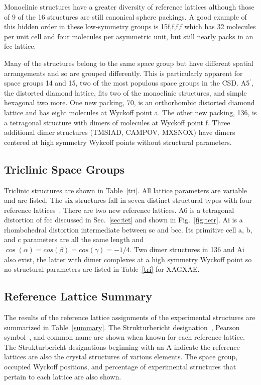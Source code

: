 \documentclass[preprint]{revtex4}              %
\begin{document}
Monoclinic structures have a greater diversity of reference lattices
although those of 9 of the 16 structures are still canonical sphere
packings. A good example of this hidden order in these low-symmetry
groups is 15f,f,f,f which has 32 molecules per unit cell and four
molecules per asymmetric unit, but still nearly packs in an fcc
lattice.

Many of the structures belong to the same space group but have
different spatial arrangements and so are grouped differently. This
is particularly apparent for space groups 14 and 15, two of the most
populous space groups in the CSD. A5$^\prime$, the distorted diamond
lattice, fits two of the monoclinic structures, and simple hexagonal
two more.  One new packing, 70, is an orthorhombic distorted diamond
lattice and has eight molecules at Wyckoff point a. The other new
packing, 136, is a tetragonal structure with dimers of molecules at
Wyckoff point f. Three additional dimer structures (TMSIAD, CAMPOV,
MXSNOX) have dimers centered at high symmetry Wykcoff points without
structural parameters.

\subsection{Triclinic Space Groups}

Triclinic structures are shown in Table~\ref{tri}. All lattice
parameters are variable and are listed.  The six structures fall in
seven distinct structural types with four reference lattices~\cite{mcclurg}. There
are two new reference lattices. A6 is a tetragonal distortion of fcc
discussed in Sec.~\ref{sec:tet} and shown in Fig.~\ref{fig:tetr}. Ai
is a rhombohedral distortion intermediate between sc and bcc. Its
primitive cell a, b, and c parameters are all the same length and
$\cos(\alpha)=cos(\beta)=cos(\gamma)=-1/4$. Two dimer structures in
136 and Ai also exist, the latter with dimer complexes at a high
symmetry Wyckoff point so no structural parameters are listed in
Table~\ref{tri} for XAGXAE.

\subsection{Reference Lattice Summary}

The results of the reference lattice assignments of the experimental
structures are summarized in Table~\ref{summary}. The
Strukturbericht designation~\cite{Wilson51}, Pearson
symbol~\cite{Pearson67}, and common name are shown when known for
each reference lattice. The Strukturbericht designations beginning
with an A indicate the reference lattices are also the crystal
structures of various elements. The space group, occupied Wyckoff
positions, and percentage of experimental structures that pertain to
each lattice are also shown.
\end{document}
